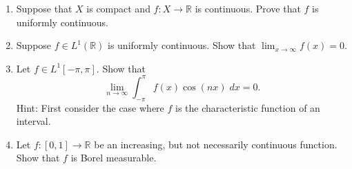 \documentclass[12pt]{article}
\def\ra{\rightarrow}
\def\Reals{{\mathbb R}}
\begin{document}
\begin{enumerate}
\item Suppose that $X$ is compact and $f:X\ra \Reals$ is continuous.  Prove that $f$ is 
uniformly continuous.

\item Suppose $f\in L^1(\Reals)$ is uniformly continuous.  Show that $\lim_{x\ra\infty}f(x)=0$.

\item 
Let $f\in L^1[-\pi,\pi]$.  Show that
$$
\lim_{n\ra\infty} \int_{-\pi}^\pi f(x)\cos(nx)\; dx = 0.
$$
Hint: First consider the case where $f$ is the characteristic function of
an interval.

\item Let $f:[0,1]\ra \Reals$ be an increasing, but not necessarily
continuous function.  Show that $f$ is Borel measurable.

\end{enumerate}
\end{document}
